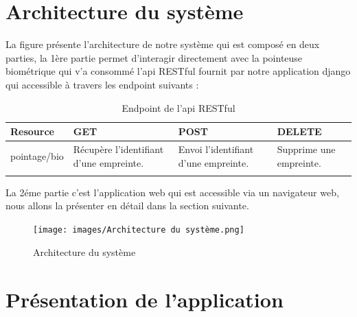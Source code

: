 \section{Architecture du système} 
        La figure présente l’architecture de notre système qui est composé en deux parties, la 1ère partie permet d’interagir directement avec la pointeuse biométrique qui v’a consommé l’api RESTful fournit par notre application django qui accessible à travers les endpoint suivants : 

        \begin{longtable}{|p{2.5cm}|p{4.5cm}|p{4.5cm}|p{4.5cm}|}
                \endhead
                \endfoot
                \hline
                Resource & GET & POST & DELETE \\
                \hline
                pointage/bio & Récupère l'identifiant d'une empreinte. & Envoi l'identifiant d'une empreinte. & Supprime une empreinte.
                \\
                \hline
                \caption{Endpoint de l'api RESTful}\\
        \end{longtable}
        La 2éme partie c’est l’application web qui est accessible via un navigateur web, nous allons la présenter en détail dans la section suivante.
            \vspace{10pt}
            \begin{figure}[h!]
                        \centering
                        \texttt{[image: images/Architecture du système.png]}
                        \label{fig84}
                        \caption{Architecture du système}
                        \label{figUFE}
            \end{figure} 
     \clearpage   
     
\section{Présentation de l'application}
